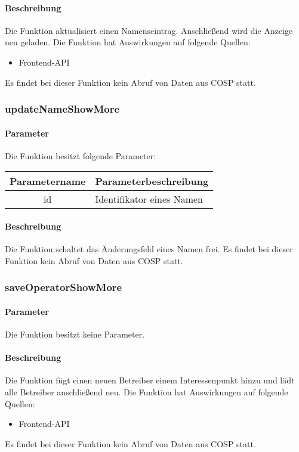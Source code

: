 \paragraph{Beschreibung} Die Funktion aktualisiert einen Namenseintrag. Anschließend wird die Anzeige neu geladen. Die Funktion hat Auswirkungen auf folgende Quellen:
\begin{itemize}
	\item Frontend-API
\end{itemize}
Es findet bei dieser Funktion kein Abruf von Daten aus {\glqq COSP\grqq} statt.
\subsubsection{updateNameShowMore}
\paragraph{Parameter} Die Funktion besitzt folgende Parameter:
\begin{table}[H]
	\begin{tabular}{|c|p{11cm}|}
		\hline
		\textbf{Parametername} & \textbf{Parameterbeschreibung} \\ \hline
		id & Identifikator eines Namen \\ \hline
	\end{tabular}
\end{table}
\paragraph{Beschreibung} Die Funktion schaltet das Änderungsfeld eines Namen frei. Es findet bei dieser Funktion kein Abruf von Daten aus {\glqq COSP\grqq} statt.
\subsubsection{saveOperatorShowMore}
\paragraph{Parameter} Die Funktion besitzt keine Parameter.
\paragraph{Beschreibung} Die Funktion fügt einen neuen Betreiber einem Interessenpunkt hinzu und lädt alle Betreiber anschließend neu. Die Funktion hat Auswirkungen auf folgende Quellen:
\begin{itemize}
	\item Frontend-API
\end{itemize}
Es findet bei dieser Funktion kein Abruf von Daten aus {\glqq COSP\grqq} statt.
